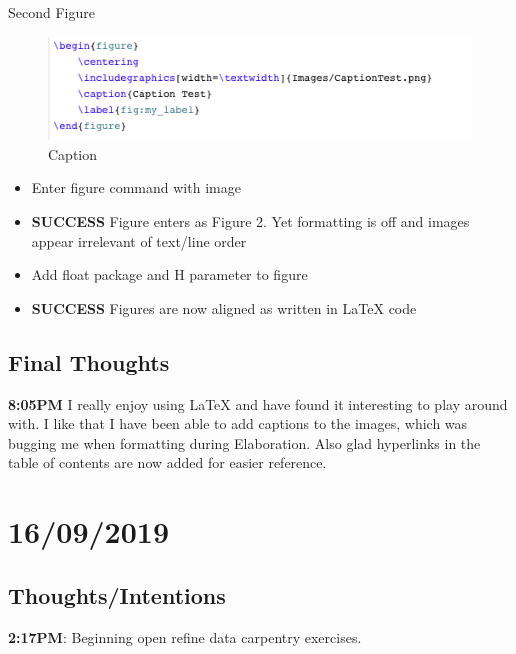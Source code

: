 \documentclass{article}
\begin{document}
Second Figure 
\begin{figure}[H]
    \centering
    \includegraphics[width=\textwidth]{Images/CaptionTest2.png}
    \caption{Caption}
    \label{fig:my_label}
\end{figure}
\begin{itemize}
\item Enter figure command with image
\item \textbf{SUCCESS} Figure enters as Figure 2. Yet formatting is off and images appear irrelevant of text/line order
\item Add float package and H parameter to figure 
\item \textbf{SUCCESS} Figures are now aligned as written in LaTeX code
\end{itemize}

\subsection{Final Thoughts}
\textbf{8:05PM} I really enjoy using LaTeX and have found it interesting to play around with. I like that I have been able to add captions to the images, which was bugging me when formatting during Elaboration. Also glad hyperlinks in the table of contents are now added for easier reference.

\section{16/09/2019}
\subsection{Thoughts/Intentions}
\textbf{2:17PM}: Beginning open refine data carpentry exercises. \\
\end{document}

